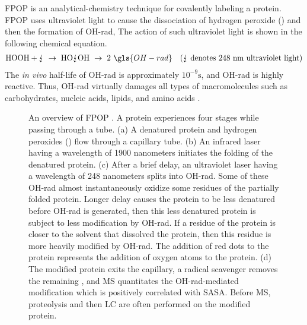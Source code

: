 \Gls{FPOP} is an analytical-chemistry technique for covalently labeling a protein.
\Gls{FPOP} uses ultraviolet light to cause the dissociation of hydrogen peroxide (\HydrogenPeroxide{}) and then the formation of \gls{OH-rad}, 
The action of such ultraviolet light is shown in the following chemical equation. %
\begin{align*}
\HydrogenPeroxide{} + {\lightning} ~ \to ~ \text{HO} {\lightning} \text{OH} ~ \to ~  2 ~ \gls{OH-rad}
& & ({\lightning}\text{ denotes 248 nm ultraviolet light})
\end{align*} %
The \textit{in vivo} half-life of \gls{OH-rad} is approximately \(10^{-9}\si{\second}\), and \gls{OH-rad} is highly reactive. %
Thus, \gls{OH-rad} virtually damages all types of macromolecules such as carbohydrates, nucleic acids, lipids, and amino acids \cite{JPI:JPI1}. 

\begin{figure}
\center
{}
\caption[
	An overview of \gls{FPOP} \cite{gruebele2010analytical}.]{
	An overview of \gls{FPOP} \cite{gruebele2010analytical}.
	A protein experiences four stages while passing through a tube. 
	(a) A denatured protein and hydrogen peroxides (\HydrogenPeroxide{}) flow through a capillary tube. 
	(b) An infrared laser having a wavelength of 1900 nanometers initiates the folding of the denatured protein.
	(c) After a brief delay, an ultraviolet laser having a wavelength of 248 nanometers 
	    		splits \HydrogenPeroxide{} into \gls{OH-rad}.
	    	Some of these \gls{OH-rad} almost instantaneously oxidize some residues of the partially folded protein.
	    	Longer delay causes the protein to be less denatured before \gls{OH-rad} is generated, 
	    		then this less denatured protein is subject to less modification by \gls{OH-rad}.
	    	If a residue of the protein is closer to the solvent that dissolved the protein,
	    		then this residue is more heavily modified by \gls{OH-rad}.
	    	The addition of red dots to the protein 
	    		represents the addition of oxygen atoms to the protein.
	(d) The modified protein exits the capillary, 
	    	a radical scavenger removes the remaining \HydrogenPeroxide{},
	    	and \gls{MS} quantitates the \gls{OH-rad}-mediated modification which is positively correlated with \gls{SASA}.
	    	Before \gls{MS}, 
	     	proteolysis and then \gls{LC} are often performed on the modified protein.      	
	\label{fig:fund2:schematics-FPOP}}
\end{figure}

